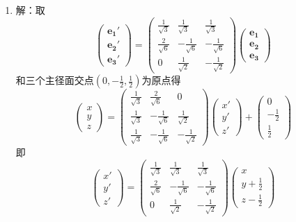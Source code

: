 \documentclass[UTF8]{ctexart}
\begin{document}
\begin{enumerate}
\item 解：取\\
$$\left(\begin{array}{c}\mathbf{e_1}'\\\mathbf{e_2}'\\\mathbf{e_3}'\end{array}\right)=\left(\begin{array}{ccc}\displaystyle\frac{1}{\sqrt{3}}&\displaystyle\frac{1}{\sqrt{3}}&\displaystyle\frac{1}{\sqrt{3}}\\\displaystyle\frac{2}{\sqrt{6}}&\displaystyle-\frac{1}{\sqrt{6}}&\displaystyle-\frac{1}{\sqrt{6}}\\0&\displaystyle\frac{1}{\sqrt{2}}&\displaystyle-\frac{1}{\sqrt{2}}\end{array}\right)\left(\begin{array}{c}\mathbf{e_1}\\\mathbf{e_2}\\\mathbf{e_3}\end{array}\right)$$
和三个主径面交点$(0,\displaystyle-\frac{1}{2},\displaystyle\frac{1}{2})$为原点得
$$\left(\begin{array}{c}x\\y\\z\end{array}\right)=\left(\begin{array}{ccc}\displaystyle\frac{1}{\sqrt{3}}&\displaystyle\frac{2}{\sqrt{6}}&0\\\displaystyle\frac{1}{\sqrt{3}}&\displaystyle-\frac{1}{\sqrt{6}}&\displaystyle\frac{1}{\sqrt{2}}\\\displaystyle\frac{1}{\sqrt{3}}&\displaystyle-\frac{1}{\sqrt{6}}&\displaystyle-\frac{1}{\sqrt{2}}\end{array}\right)\left(\begin{array}{c}x'\\y'\\z'\end{array}\right)+\left(\begin{array}{c}0\\-\displaystyle\frac{1}{2}\\\displaystyle\frac{1}{2}\end{array}\right)$$
即$$\left(\begin{array}{c}x'\\y'\\z'\end{array}\right)=\left(\begin{array}{ccc}\displaystyle\frac{1}{\sqrt{3}}&\displaystyle\frac{1}{\sqrt{3}}&\displaystyle\frac{1}{\sqrt{3}}\\\displaystyle\frac{2}{\sqrt{6}}&\displaystyle-\frac{1}{\sqrt{6}}&\displaystyle-\frac{1}{\sqrt{6}}\\0&\displaystyle\frac{1}{\sqrt{2}}&\displaystyle-\frac{1}{\sqrt{2}}\end{array}\right)\left(\begin{array}{c}x\\y+\displaystyle\frac{1}{2}\\z-\displaystyle\frac{1}{2}\end{array}\right)$$

\end{enumerate}
\end{document}
